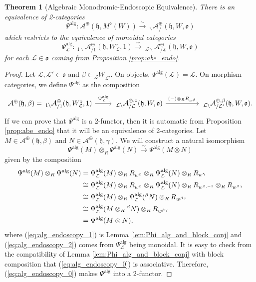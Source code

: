 \documentclass{amsart}
\newcommand{\scrA}{\mathcal{A}}
\newcommand{\scrL}{\mathcal{L}}
\newcommand{\fr}[1]{\mathfrak{#1}}
\DeclareMathOperator{\alg}{alg}
\newcommand{\Amon}[2]{\:_{#1 \backslash} \mathcal{A}_{/ #2} }
\newcommand{\uW}[2]{{}_{#1}\underline{W}_{#2}}
\newtheorem{theorem}[subsubsection]{Theorem}
\theoremstyle{definition}
\numberwithin{equation}{subsection}
\begin{document}
\begin{theorem}[Algebraic Monodromic-Endoscopic Equivalence]\label{thm:alg_endoscopy}
    There is an equivalence of 2-categories
    \[ \Psi^{\alg} : \scrA^{\oplus} (\fr{h}, M^{\fr{o}} (W)) \stackrel{\sim}{\to} \Amon{}{}^{\oplus} (\fr{h}, W, \fr{o}) \]
    which restricts to the equivalence of monoidal categories 
    \[ \Psi_{\scrL}^{\alg} : \Amon{1}{1}^{\oplus} (\fr{h}, W_{\scrL}^{\circ}, 1) \stackrel{\sim}{\to} \Amon{\scrL}{\scrL}^{\oplus} (\fr{h}, W, \fr{o})\]
    for each $\scrL \in \fr{o}$ coming from Proposition \ref{prop:abe_endo}.
\end{theorem}
\begin{proof}
    Let $\scrL, \scrL' \in \fr{o}$ and $\beta \in \uW{\scrL}{\scrL'}$. On objects, $\Psi^{\alg} (\scrL) = \scrL$. On morphism categories, we define $\Psi^{\alg}$ as the composition
    \[\begin{tikzcd}
{\scrA^{\oplus} (\fr{h}, \beta) = \Amon{1}{1}^{\oplus} (\fr{h}, W_{\scrL}^{\circ}, 1)} \arrow[r, "\Psi_{\scrL}^{\alg}"] & {\Amon{\scrL}{\scrL}^{\oplus, \circ} (\fr{h}, W, \fr{o})} \arrow[rr, "(-) \otimes_R R_{w^{\beta}}"] &  & {\Amon{\scrL}{\scrL'}^{\oplus, \beta} (\fr{h}, W, \fr{o}).}
\end{tikzcd}\]
If we can prove that $\Psi^{\alg}$ is a 2-functor, then it is automatic from Proposition \ref{prop:abe_endo} that it will be an equivalence of 2-categories.
Let $M \in \scrA^{\oplus} (\fr{h}, \beta)$ and $N \in \scrA^{\oplus} (\fr{h}, \gamma)$. We will construct a natural isomorphism
\begin{equation}\label{eq:alg_endoscopy_0}
    \Psi^{\alg} (M) \otimes_R \Psi^{\alg} (N) \stackrel{\sim}{\to} \Psi^{\alg} (M \otimes N)
\end{equation}
given by the composition
\begin{align}
    \Psi^{\alg} (M) \otimes_R \Psi^{\alg} (N) &= \Psi_{\scrL}^{\alg} (M) \otimes_R R_{w^{\beta}} \otimes_R \Psi_{\scrL}^{\alg} (N) \otimes_R R_{w^{\gamma}} \notag \\
    &\cong \Psi_{\scrL}^{\alg} (M) \otimes_R R_{w^{\beta}} \otimes_R \Psi_{\scrL}^{\alg} (N) \otimes_R R_{w^{\beta, -1}} \otimes_R R_{w^{\beta \gamma}} \notag \\
    &\cong \Psi_{\scrL}^{\alg} (M) \otimes_R \Psi_{\scrL}^{\alg} ({}^{\beta} N) \otimes_R R_{w^{\beta \gamma}} \label{eq:alg_endoscopy_1} \\
    &\cong \Psi_{\scrL}^{\alg} (M \otimes_R {}^{\beta} N ) \otimes_R R_{w^{\beta \gamma}} \label{eq:alg_endoscopy_2} \\
    &=  \Psi^{\alg} (M \otimes N), \notag
\end{align}
where (\ref{eq:alg_endoscopy_1}) is Lemma \ref{lem:Phi_alg_and_block_conj} and (\ref{eq:alg_endoscopy_2}) comes from $\Psi_{\scrL}^{\alg}$ being monoidal.
It is easy to check from the compatibility of Lemma \ref{lem:Phi_alg_and_block_conj} with block composition that (\ref{eq:alg_endoscopy_0}) is associative. 
Therefore, (\ref{eq:alg_endoscopy_0}) makes $\Psi^{\alg}$ into a 2-functor.
\end{proof}
\end{document}
